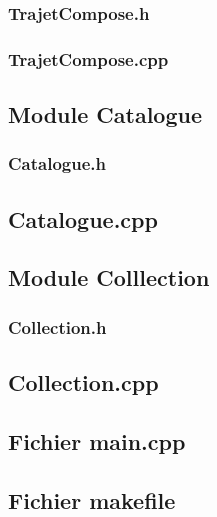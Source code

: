 \documentclass[10pt,a4paper,twoside]{article}
\begin{document}
\subsubsection{TrajetCompose.h}


\newpage
\subsubsection{TrajetCompose.cpp}


\newpage
\subsection{Module Catalogue}
\subsubsection{Catalogue.h}


\newpage
\subsection{Catalogue.cpp}


\newpage
\subsection{Module Colllection}
\subsubsection{Collection.h}


\newpage
\subsection{Collection.cpp}


\newpage
\subsection{Fichier main.cpp}


\newpage
\subsection{Fichier makefile}

\end{document}
